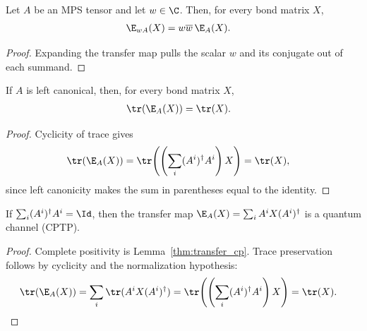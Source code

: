 \begin{lemma}
    \label{lem:transfer_map_smul}
    \leanok
    Let $A$ be an MPS tensor and let $w\in\C$. Then, for every bond matrix $X$,
    \begin{align}
        \E_{wA}(X) & =w\overline w\,\E_A(X).
        \notag
    \end{align}
\end{lemma}

\begin{proof}\leanok
    Expanding the transfer map pulls the scalar $w$ and its conjugate out of
    each summand.
\end{proof}

\begin{lemma}
    \label{lem:trace_transfer_map_left_canonical}
    \leanok
    If $A$ is left canonical, then, for every bond matrix $X$,
    \begin{align}
        \tr(\E_A(X)) & =\tr(X).
        \notag
    \end{align}
\end{lemma}

\begin{proof}\leanok
    Cyclicity of trace gives
    \begin{align}
        \tr(\E_A(X))
         & =\tr\!\left(\left(\sum_i(A^i)^\dagger A^i\right)X\right)
        =\tr(X),
        \notag
    \end{align}
    since left canonicity makes the sum in parentheses equal to the identity.
\end{proof}

\begin{theorem}\label{thm:transfer_channel}
    \leanok
    If $\sum_i(A^i)^\dagger A^i=\Id$, then the transfer map
    $\E_A(X)=\sum_i A^iX(A^i)^\dagger$ is a quantum channel (CPTP).
\end{theorem}

\begin{proof}\leanok{}
    Complete positivity is Lemma~\ref{thm:transfer_cp}. Trace preservation
    follows by cyclicity and the normalization hypothesis:
    \begin{align}
        \tr(\E_A(X))
         & =\sum_i\tr(A^iX(A^i)^\dagger)
        =\tr\!\left(\left(\sum_i(A^i)^\dagger A^i\right)X\right)
        =\tr(X).
        \notag
    \end{align}
\end{proof}

